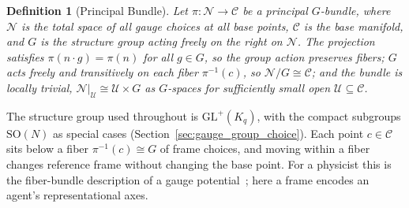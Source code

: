 \documentclass[11pt]{article}
\newtheorem{definition}{Definition}
\begin{document}
\begin{definition}[Principal Bundle]
Let $\pi: \mathcal{N} \to \mathcal{C}$ be a principal $G$-bundle, where $\mathcal{N}$ is the total space of all gauge choices at all base points, $\mathcal{C}$ is the base manifold, and $G$ is the structure group acting freely on the right on $\mathcal{N}$. The projection satisfies $\pi(n \cdot g) = \pi(n)$ for all $g \in G$, so the group action preserves fibers; $G$ acts freely and transitively on each fiber $\pi^{-1}(c)$, so $\mathcal{N}/G \cong \mathcal{C}$; and the bundle is locally trivial, $\mathcal{N}|_{\mathcal{U}} \cong \mathcal{U} \times G$ as $G$-spaces for sufficiently small open $\mathcal{U} \subseteq \mathcal{C}$.
\end{definition}

The structure group used throughout is $\mathrm{GL}^+(K_q)$, with the compact subgroups $\mathrm{SO}(N)$ as special cases (Section~\ref{sec:gauge_group_choice}). Each point $c\in\mathcal{C}$ sits below a fiber $\pi^{-1}(c)\cong G$ of frame choices, and moving within a fiber changes reference frame without changing the base point. For a physicist this is the fiber-bundle description of a gauge potential~\cite{WuYang1975, Nakahara2003}; here a frame encodes an agent's representational axes.
\end{document}
